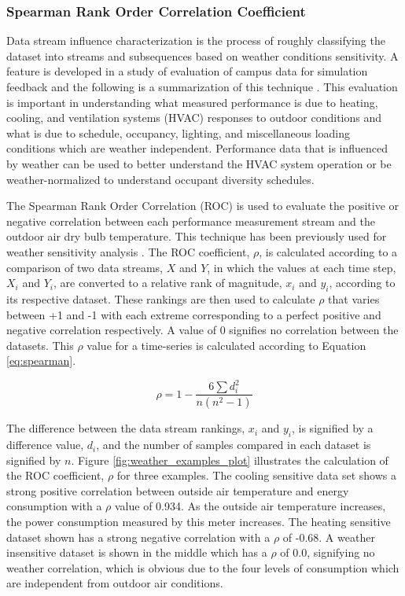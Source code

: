 \subsubsection{Spearman Rank Order Correlation Coefficient}
\label{sec:weathercorrelationcoeff}

Data stream influence characterization is the process of roughly classifying the dataset into streams and subsequences based on weather conditions sensitivity. A feature is developed in a study of evaluation of campus data for simulation feedback and the following is a summarization of this technique \cite{miller_forensically_2015}. This evaluation is important in understanding what measured performance is due to heating, cooling, and ventilation systems (HVAC) responses to outdoor conditions and what is due to schedule, occupancy, lighting, and miscellaneous loading conditions which are weather independent. Performance data that is influenced by weather can be used to better understand the HVAC system operation or be weather-normalized to understand occupant diversity schedules. %

The Spearman Rank Order Correlation (ROC) is used to evaluate the positive or negative correlation between each performance measurement stream and the outdoor air dry bulb temperature. This technique has been previously used for weather sensitivity analysis \cite{coughlin_statistical_2009}. The ROC coefficient, $\rho$, is calculated according to a comparison of two data streams, $X$ and $Y$, in which the values at each time step, $X_i$ and $Y_i$, are converted to a relative rank of magnitude, $x_i$ and $y_i$, according to its respective dataset. These rankings are then used to calculate $\rho$ that varies between +1 and -1 with each extreme corresponding to a perfect positive and negative correlation respectively. A value of 0 signifies no correlation between the datasets. This $\rho$ value for a time-series is calculated according to Equation \ref{eq:spearman}.

\begin{equation}
\rho = 1 - \frac{6\sum d_i^2}{n(n^2-1)}
\label{eq:spearman}
\end{equation}

The difference between the data stream rankings, $x_i$ and $y_i$, is signified by a difference value, $d_i$, and the number of samples compared in each dataset is signified by $n$. Figure \ref{fig:weather_examples_plot} illustrates the calculation of the ROC coefficient, $\rho$ for three examples. The cooling sensitive data set shows a strong positive correlation between outside air temperature and energy consumption with a $\rho$ value of 0.934. As the outside air temperature increases, the power consumption measured by this meter increases. The heating sensitive dataset shown has a strong negative correlation with a $\rho$ of -0.68. A weather insensitive dataset is shown in the middle which has a $\rho$ of 0.0, signifying no weather correlation, which is obvious due to the four levels of consumption which are independent from outdoor air conditions.
